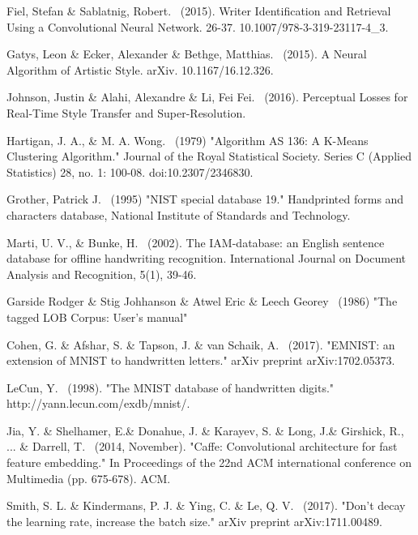 \documentclass{article}
\begin{document}
\begin{thebibliography}{99}
   Fiel, Stefan \& Sablatnig, Robert. \ (2015). Writer Identification and Retrieval Using a Convolutional Neural Network. 26-37. 10.1007/978-3-319-23117-4\_3. 

   Gatys, Leon \& Ecker, Alexander \& Bethge, Matthias. \ (2015). A Neural Algorithm of Artistic Style. arXiv. 10.1167/16.12.326. 

   Johnson, Justin \& Alahi, Alexandre \& Li, Fei Fei. \ (2016). Perceptual Losses for Real-Time Style Transfer and Super-Resolution. 

   Hartigan, J. A., \& M. A. Wong. \ (1979) "Algorithm AS 136: A K-Means Clustering Algorithm." Journal of the Royal Statistical Society. Series C (Applied Statistics) 28, no. 1: 100-08. doi:10.2307/2346830.

   Grother, Patrick J. \ (1995) "NIST special database 19." Handprinted forms and characters database, National Institute of Standards and Technology.

   Marti, U. V., \& Bunke, H. \ (2002). The IAM-database: an English sentence database for offline handwriting recognition. International Journal on Document Analysis and Recognition, 5(1), 39-46.

   Garside Rodger \& Stig Johhanson \& Atwel Eric \& Leech Georey \ (1986) "The tagged LOB Corpus: User's manual"

   Cohen, G. \& Afshar, S. \& Tapson, J. \& van Schaik, A. \ (2017). "EMNIST: an extension of MNIST to handwritten letters." arXiv preprint arXiv:1702.05373.

   LeCun, Y. \ (1998). "The MNIST database of handwritten digits." http://yann.lecun.com/exdb/mnist/.

   Jia, Y. \& Shelhamer, E.\& Donahue, J. \& Karayev, S. \& Long, J.\& Girshick, R., ... \& Darrell, T. \ (2014, November). "Caffe: Convolutional architecture for fast feature embedding." In Proceedings of the 22nd ACM international conference on Multimedia (pp. 675-678). ACM.

   Smith, S. L. \& Kindermans, P. J. \& Ying, C. \& Le, Q. V. \ (2017). "Don't decay the learning rate, increase the batch size." arXiv preprint arXiv:1711.00489.
\end{thebibliography}
\end{document}
